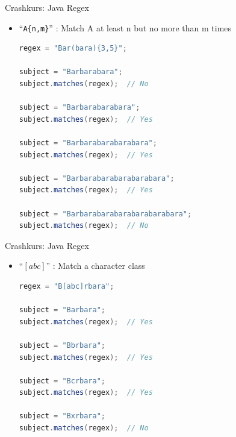 \documentclass[18pt]{beamer}
\newcommand{\quotes}[1]{``#1''}
\begin{document}
\begin{frame}[fragile]{Crashkurs: Java Regex}
    \begin{itemize}
        \item \Large{\quotes{\alert{\texttt{A\{n,m\}}}}} : Match A at least n but no more than m times

        \vspace{.2in}

        \begin{lstlisting}[language=Java,basicstyle=\scriptsize]
regex = "Bar(bara){3,5}";

subject = "Barbarabara";
subject.matches(regex);  // No

subject = "Barbarabarabara";
subject.matches(regex);  // Yes

subject = "Barbarabarabarabara";
subject.matches(regex);  // Yes

subject = "Barbarabarabarabarabara";
subject.matches(regex);  // Yes

subject = "Barbarabarabarabarabarabara";
subject.matches(regex);  // No
        \end{lstlisting}

    \end{itemize}
\end{frame}


\begin{frame}[fragile]{Crashkurs: Java Regex}
    \begin{itemize}
        \item \Large{\quotes{\alert{\texttt{$\left[abc\right]$}}}} : Match a character class

        \vspace{.2in}

        \begin{lstlisting}[language=Java,basicstyle=\scriptsize]
regex = "B[abc]rbara";

subject = "Barbara";
subject.matches(regex);  // Yes

subject = "Bbrbara";
subject.matches(regex);  // Yes

subject = "Bcrbara";
subject.matches(regex);  // Yes

subject = "Bxrbara";
subject.matches(regex);  // No
        \end{lstlisting}

    \end{itemize}
\end{frame}
\end{document}
